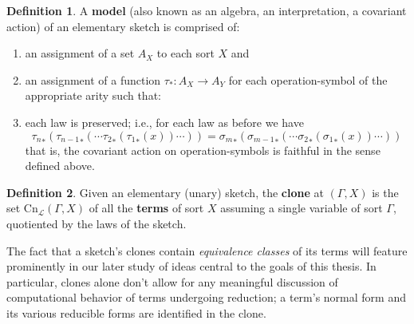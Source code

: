 \documentclass[12pt,twoside]{reedthesis}
\theoremstyle{definition}
\newtheorem{definition}{Definition}
\newtheorem{example}{Example}
\theoremstyle{remark}
\theoremstyle{plain}
\begin{document}

  \begin{definition}\label{def:model}
    A \textbf{model} (also known as an algebra, an interpretation, a covariant
    action) of an elementary sketch is comprised of:
    \begin{enumerate}
      \item an assignment of a set $A_X$ to each sort $X$ and
      \item an assignment of a function $\tau_* : A_X \rightarrow A_Y$ for each
            operation-symbol of the appropriate arity such that:
      \item each law is preserved; i.e., for each law as before we have
            \[ {\tau_n}_* ({\tau_{n-1}}_* (\cdots {\tau_2}_* ({\tau_1}_* (x))\cdots )) = {\sigma_m}_* ({\sigma_{m-1}}_*(\cdots {\sigma_2}_* ({\sigma_1}_* (x))\cdots )) \]
            that is, the covariant action on operation-symbols is faithful in
            the sense defined above.
    \end{enumerate}
  \end{definition}

  \begin{definition}\label{def:clone}
    Given an elementary (unary) sketch, the \textbf{clone} at \( (\Gamma, X) \) is
    the set \( \text{Cn}_\mathcal{L} (\Gamma, X) \) of all the \textbf{terms} of sort
    $X$ assuming a single variable of sort $\Gamma$, quotiented by the laws of the
    sketch.
  \end{definition}
  The fact that a sketch's clones contain \emph{equivalence classes} of its
  terms will feature prominently in our later study of ideas central to the
  goals of this thesis. In particular, clones alone don't allow for any
  meaningful discussion of computational behavior of terms undergoing reduction;
  a term's normal form and its various reducible forms are identified in the
  clone.
\end{document}
